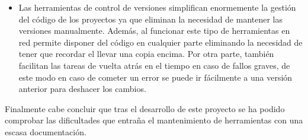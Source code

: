 \begin{itemize}
	\item Las herramientas de control de versiones simplifican enormemente la gestión del código de los proyectos ya que eliminan la necesidad de mantener las versiones manualmente. Además, al funcionar este tipo de herramientas en red permite disponer del código en cualquier parte eliminando la necesidad de tener que recordar el llevar una copia encima. Por otra parte, también facilitan las tareas de vuelta atrás en el tiempo en caso de fallos graves, de este modo en caso de cometer un error se puede ir fácilmente a una versión anterior para deshacer los cambios.
\end{itemize}

Finalmente cabe concluir que tras el desarrollo de este proyecto se ha podido comprobar las dificultades que entraña el mantenimiento de herramientas con una escasa documentación.